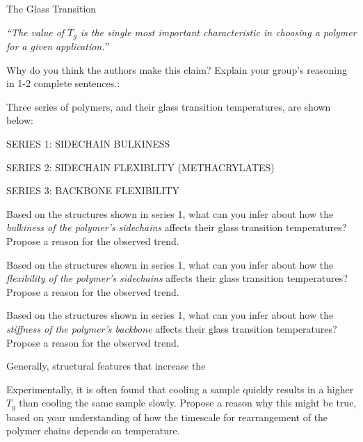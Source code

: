\begin{activity}{The Glass Transition}
\begin{ctqs}
		\emph{``The value of $T_g$ is the single most important characteristic in choosing a polymer for a given application.''}
		
		Why do you think the authors make this claim?  Explain your group's reasoning in 1-2 complete sentences.:
			
				\begin{solution}[1.5in]
				\end{solution}
	
\end{ctqs}

\begin{model}
	\label{\labelbase:mdl:Tgdeterminants}

	Three series of polymers, and their glass transition temperatures, are shown below:
	
	SERIES 1: SIDECHAIN BULKINESS
	
	SERIES 2: SIDECHAIN FLEXIBLITY (METHACRYLATES)
	
	SERIES 3: BACKBONE FLEXIBILITY
	
\end{model}

\begin{ctqs}

	\question Based on the structures shown in series 1, what can you infer about how the \emph{bulkiness of the polymer's sidechains} affects their glass transition temperatures?  Propose a reason for the observed trend.
	
	\question Based on the structures shown in series 1, what can you infer about how the \emph{flexibility of the polymer's sidechains} affects their glass transition temperatures?  Propose a reason for the observed trend.
	
	\question Based on the structures shown in series 1, what can you infer about how the \emph{stiffness of the polymer's backbone} affects their glass transition temperatures?  Propose a reason for the observed trend.
	
\end{ctqs}

\begin{infobox}
	Generally, structural features that increase the 
\end{infobox}

\begin{exercises}

	\exercise Experimentally, it is often found that cooling a sample quickly results in a higher $T_g$ than cooling the same sample slowly.  Propose a reason why this might be true, based on your understanding of how the timescale for rearrangement of the polymer chains depends on temperature.
	

\end{exercises}
\end{activity}
